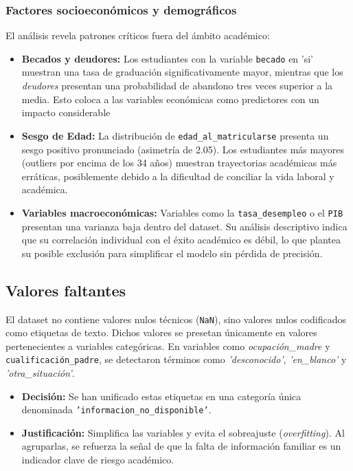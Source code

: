 \documentclass{article}
\begin{document}
\subsubsection{Factores socioeconómicos y demográficos}
El análisis revela patrones críticos fuera del ámbito académico:
\begin{itemize}
    \item \textbf{Becados y deudores:} Los estudiantes con la variable \texttt{becado} en 'si' muestran una tasa de graduación significativamente mayor, mientras que los \textit{deudores} presentan una probabilidad de abandono tres veces superior a la media. Esto coloca a las variables económicas como predictores con un impacto considerable
    \item \textbf{Sesgo de Edad:} La distribución de \texttt{edad\_al\_matricularse} presenta un sesgo positivo pronunciado (asimetría de 2.05). Los estudiantes más mayores (outliers por encima de los 34 años) muestran trayectorias académicas más erráticas, posiblemente debido a la dificultad de conciliar la vida laboral y académica.
    \item \textbf{Variables macroeconómicas:} Variables como la \texttt{tasa\_desempleo} o el \texttt{PIB} presentan una varianza baja dentro del dataset. Su análisis descriptivo indica que su correlación individual con el éxito académico es débil, lo que plantea su posible exclusión para simplificar el modelo sin pérdida de precisión.
\end{itemize}

\subsection{Valores faltantes}
El dataset no contiene valores nulos técnicos 
(\texttt{NaN}), sino valores nulos codificados como etiquetas de texto. Dichos valores se presetan
únicamente en valores pertenecientes a variables categóricas. En variables como \textit{ocupación\_madre} 
y \texttt{cualificación\_padre}, se detectaron términos como \textit{'desconocido'}, \textit{'en\_blanco'}
y \textit{'otra\_situación'}.

\begin{itemize}
    \item \textbf{Decisión:} Se han unificado estas etiquetas en una categoría única 
    denominada \texttt{'informacion\_no\_disponible'}.
\item \textbf{Justificación:} Simplifica las variables y evita el sobreajuste 
(\textit{overfitting}). Al agruparlas, se refuerza la señal de que la falta de 
información familiar es un indicador clave de riesgo académico.
\end{itemize}
\end{document}
